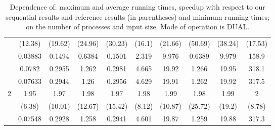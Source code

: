 \begin{table}[ht]
\begin{tabular}{c|c|c|c|c|c|c|c|c|c|}
 & (12.38) & (19.62) & (24.96) & (30.23) & (16.1) & (21.66) & (50.69) & (38.24) & (17.53) \\
 & 0.03883 & 0.1494 & 0.6384 & 0.1501 & 2.319 & 9.976 & 0.6389 & 9.979 & 158.9 \\
\hline
 & 0.0782 & 0.2955 & 1.262 & 0.2981 & 4.665 & 19.92 & 1.266 & 19.95 & 318.1 \\
 & 0.07633 & 0.2944 & 1.26 & 0.2956 & 4.629 & 19.91 & 1.262 & 19.92 & 317.5 \\
2 & 1.95 & 1.97 & 1.98 & 1.97 & 1.98 & 1.99 & 1.98 & 1.99 & 2 \\
 & (6.38) & (10.01) & (12.67) & (15.42) & (8.12) & (10.87) & (25.72) & (19.2) & (8.78) \\
 & 0.07548 & 0.2928 & 1.258 & 0.2941 & 4.601 & 19.87 & 1.259 & 19.88 & 317.3 \\
\hline
\end{tabular}
\caption{Dependence of: maximum and average running times, speedup with respect to our sequential results and reference results (in parentheses) and minimum running times; on the number of processes and input size. Mode of operation is DUAL.}
\end{table}

